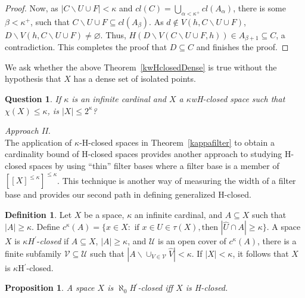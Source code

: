 \documentclass[11pt]{amsart}
\newif\ifdraft\draftfalse
\newtheorem{question}[theorem]{Question}
\newtheorem{proposition}[theorem]{Proposition}
\theoremstyle{definition}
\newtheorem{definition}[theorem]{Definition}
\theoremstyle{remark}
\numberwithin{equation}{section}
\begin{document}
\begin{proof}
Now, as $|C\backslash U \cup F| < \kappa$ and $cl(C) =   \bigcup_{\alpha < \kappa^+}cl(A_{\alpha})$, there is some $\beta <\kappa^+$, such that $C\backslash U \cup F \subseteq cl(A_{\beta})$.  As $d \not\in V(h,C\backslash U \cup F)$, $D\backslash V(h,C\backslash U \cup F) \ne \varnothing$.  Thus, $H( D\backslash V(C\backslash U \cup F,h)) \in A_{\beta +1} \subseteq C$, a contradiction.  This completes the proof that $D \subseteq C$ and finishes the proof. 
\end{proof}
We ask whether the above Theorem~\ref{kwHclosedDense} is true without the hypothesis that $X$ has a dense set of isolated points.
\begin{question}
If $\kappa$ is an infinite cardinal and $X$ a $\kappa$wH-closed space such that $\chi(X)\leq\kappa$, is $|X|\leq 2^{\kappa}$?
\end{question}

\noindent\emph{Approach II.}\\
    
The application of $\kappa$-H-closed spaces in Theorem~\ref{kappafilter} to obtain a cardinality bound of H-closed spaces  provides another approach to studying H-closed spaces by using ``thin'' filter bases where a filter base is a member of $[[X]^{\leq \kappa}]^{\leq \kappa}$.   This technique is another way of measuring the width of a filter base and provides our second path in defining generalized H-closed.  

\begin{definition}{{\immediate{}}{\ifdraft\hspace{-\lastskip}\vadjust{\vspace{-1mm}\smash{\llap{{\tt {{defII}}}\hspace{8mm}}}\vspace{1mm}}\fi}}  
Let $X$ be a space, $\kappa$ an infinite cardinal, and  $A \subseteq X$ such that $|A| \geq \kappa$. Define $c^{\kappa}(A) = \{x \in X: \text{ if } x \in U \in \tau(X), \text{then } |\hat{U} \cap A| \geq \kappa \}$.  A space $X$ is $\kappa H^{\prime}$-\emph{closed} if $A \subseteq X$, $|A| \geq \kappa$, and $\mathcal U$ is an open cover of $c^{\kappa}(A)$, there is a finite subfamily $\mathcal V \subseteq \mathcal U$ such that $|A \backslash \cup_{V \in \mathcal V}\hat{V}| < \kappa$.  If $|X| < \kappa$, it follows that $X$ is ${\kappa}$H$^{\prime}$-closed.
\end{definition}

\begin{proposition}{{\immediate{}}{\ifdraft\hspace{-\lastskip}\vadjust{\vspace{-1mm}\smash{\llap{{\tt {{HclII}}}\hspace{8mm}}}\vspace{1mm}}\fi}}  
A space $X$ is $\aleph_0$H$^{\prime}$-closed iff $X$ is H-closed.
\end{proposition}
\end{document}
